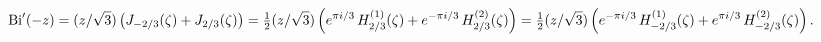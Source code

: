 \[\mathop{\mathrm{Bi}\/}\nolimits'\!\left(-z\right)=(z/\sqrt{3})\left(\mathop{J_%
{-2/3}\/}\nolimits\!\left(\zeta\right)+\mathop{J_{2/3}\/}\nolimits\!\left(%
\zeta\right)\right)=\tfrac{1}{2}(z/\sqrt{3})\left(e^{\pi i/3}\mathop{{H^{(1)}_%
{2/3}}\/}\nolimits\!\left(\zeta\right)+e^{-\pi i/3}\mathop{{H^{(2)}_{2/3}}\/}%
\nolimits\!\left(\zeta\right)\right)=\tfrac{1}{2}(z/\sqrt{3})\left(e^{-\pi i/3%
}\mathop{{H^{(1)}_{-2/3}}\/}\nolimits\!\left(\zeta\right)+e^{\pi i/3}\mathop{{%
H^{(2)}_{-2/3}}\/}\nolimits\!\left(\zeta\right)\right).\]